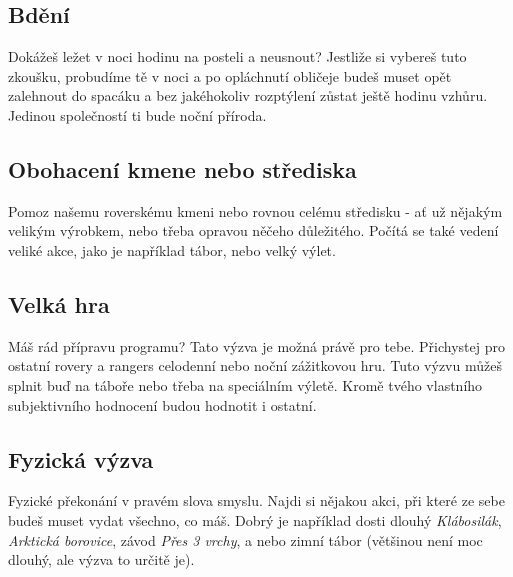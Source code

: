 \documentclass[11pt, fleqn]{article}
\begin{document}
  \subsection*{Bdění}
  Dokážeš ležet v noci hodinu na posteli a neusnout? Jestliže si vybereš tuto zkoušku, probudíme tě v noci a po opláchnutí obličeje budeš muset opět zalehnout do spacáku a bez jakéhokoliv rozptýlení zůstat ještě hodinu vzhůru. Jedinou společností ti bude noční příroda.
  \subsection*{Obohacení kmene nebo střediska}
  Pomoz našemu roverskému kmeni nebo rovnou celému středisku - ať už nějakým velikým výrobkem, nebo třeba opravou něčeho důležitého. Počítá se také vedení veliké akce, jako je například tábor, nebo velký výlet.
  \subsection*{Velká hra}
  Máš rád přípravu programu? Tato výzva je možná právě pro tebe. Přichystej pro ostatní rovery a rangers celodenní nebo noční zážitkovou hru. Tuto výzvu můžeš splnit buď na táboře nebo třeba na speciálním výletě. Kromě tvého vlastního subjektivního hodnocení budou hodnotit i ostatní.
  \subsection*{Fyzická výzva}
  Fyzické překonání v pravém slova smyslu. Najdi si nějakou akci, při které ze sebe budeš muset vydat všechno, co máš. Dobrý je například dosti dlouhý \textit{Klábosilák}, \textit{Arktická borovice}, závod \textit{Přes 3 vrchy}, a nebo zimní tábor (většinou není moc dlouhý, ale výzva to určitě je).
\end{document}
